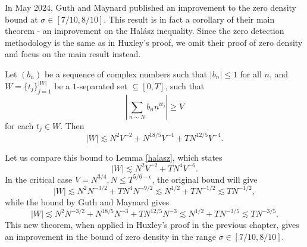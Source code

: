 In May 2024, Guth and Maynard published an improvement to the zero density bound at $\sigma\in[7/10,8/10]$.
This result is in fact a corollary of their main theorem - an improvement on the Hal\'asz inequality. Since the zero detection methodology is the same as in Huxley's proof, we omit their proof of zero density and focus
on the main result instead.

\begin{theorem}
    Let $(b_n)$ be a sequence of complex numbers such that $|b_n|\leq 1$ for all $n$, and $W=\{t_j\}_{j=1}^{|W|}$ be a $1$-separated set $\subseteq [0,T]$, such that \[
    \left|\sum_{n\sim N}b_n n^{it_j}\right|\geq V
    \]
    for each $t_j\in W$. Then \[
    |W|\lesssim N^2V^{-2}+N^{18/5}V^{-4}+TN^{12/5}V^{-4}.
    \]
\end{theorem}
Let us compare this bound to Lemma \ref{halasz}, which states \[
|W|\lesssim N^2V^{-2}+TN^4V^{-6}.
\]
In the critical case $V=N^{3/4}, N\leq T^{5/6-\epsilon}$, the original bound will give \[
|W|\lesssim N^2N^{-3/2}+TN^4N^{-9/2}\lesssim N^{1/2}+ TN^{-1/2}\lesssim TN^{-1/2},
\]
while the bound by Guth and Maynard gives \[
|W|\lesssim N^2N^{-3/2}+N^{18/5}N^{-3}+TN^{12/5}N^{-3}\lesssim N^{1/2}+TN^{-3/5}\lesssim TN^{-3/5}.
\]
This new theorem, when applied in Huxley's proof in the previous chapter, gives an improvement in the bound of zero density in the range $\sigma\in[7/10,8/10]$.
